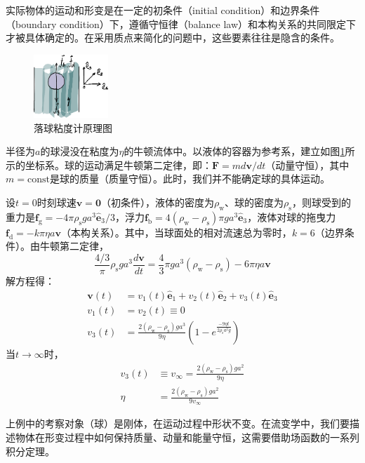 \documentclass[main.tex]{subfiles}
\begin{document}
实际物体的运动和形变是在一定的初条件（initial condition）和边界条件（boundary condition）下，遵循守恒律（balance law）和本构关系的共同限定下才被具体确定的。在采用质点来简化的问题中，这些要素往往是隐含的条件。

\begin{figure}[h]
\centering
\includegraphics[width=0.25\textwidth]{images/I.1.5.eps}
\caption{落球粘度计原理图}
\label{fig:I.1.5}
\end{figure}

\begin{example}[落球粘度计]\label{exp:I.1.5}
半径为$a$的球浸没在粘度为$\eta$的牛顿流体中。以液体的容器为参考系，建立如图\ref{fig:I.1.5}所示的坐标系。球的运动满足牛顿第二定律，即：$\mathbf{F}=md\mathbf{v}/dt$（动量守恒），其中$m=\mathrm{const}$是球的质量（质量守恒）。此时，我们并不能确定球的具体运动。

设$t=0$时刻球速$\mathbf{v}=\mathbf{0}$（初条件），液体的密度为$\rho_\mathrm{w}$、球的密度为$\rho_\mathrm{s}$，则球受到的重力是$\mathbf{f}_\mathrm{g}=-4\pi\rho_\mathrm{s}ga^3\mathbf{\hat{e}}_3/3$，浮力$\mathbf{f}_\mathrm{b}=4\left(\rho_\mathrm{w}-\rho_\mathrm{s}\right)\pi ga^3\mathbf{\hat{e}}_3$，液体对球的拖曳力$\mathbf{f}_\mathrm{d}=-k\pi\eta a\mathbf{v}$（本构关系）。其中，当球面处的相对流速总为零时，$k=6$（边界条件）。由牛顿第二定律，
\[
\frac{4/3}\pi\rho_\mathrm{s}ga^3\frac{d\mathbf{v}}{dt}=\frac{4}{3}\pi ga^3\left(\rho_\mathrm{w}-\rho_\mathrm{s}\right)-6\pi\eta a\mathbf{v}
\]
解方程得：
\begin{align*}
    \mathbf{v}\left(t\right)&=v_1\left(t\right)\mathbf{\hat{e}}_1+v_2\left(t\right)\mathbf{\hat{e}}_2+v_3\left(t\right)\mathbf{\hat{e}}_3\\
    v_1\left(t\right)&=v_2\left(t\right)\equiv0\\
    v_3\left(t\right)&=\frac{2\left(\rho_\mathrm{w}-\rho_\mathrm{s}\right)ga^3}{9\eta}\left(1-e^{\frac{-9\eta t}{2\rho_\mathrm{s}a^2g}}\right)
\end{align*}
当$t\rightarrow\infty$时，
\begin{align*}
v_3\left(t\right)&\equiv v_\infty= \frac{2\left(\rho_\mathrm{w}-\rho_\mathrm{s}\right)ga^2}{9\eta}\\
\eta&=\frac{2\left(\rho_\mathrm{w}-\rho_\mathrm{s}\right)ga^2}{9v_\infty}
\end{align*}
\end{example}

上例中的考察对象（球）是刚体，在运动过程中形状不变。在流变学中，我们要描述物体在形变过程中如何保持质量、动量和能量守恒，这需要借助场函数的一系列积分定理。
\end{document}
